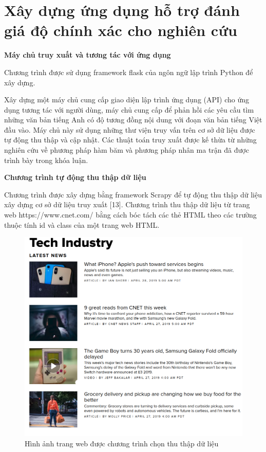 \documentclass[12pt]{report}
\begin{document}
\section{Xây dựng ứng dụng hỗ trợ đánh giá độ chính xác cho nghiên cứu}
\textbf{Máy chủ truy xuất và tương tác với ứng dụng}

Chương trình được sử dụng framework flask của ngôn ngữ lập trình Python để xây dựng.

Xây dựng một máy chủ cung cấp giao diện lập trình ứng dụng (API) cho ứng dụng tương tác với người dùng, máy chủ cung cấp để phản hồi các yêu cầu tìm những văn bản tiếng Anh có độ tương đồng nội dung với đoạn văn bản tiếng Việt đầu vào. Máy chủ này sử dụng những thư viện truy vấn trên cơ sở dữ liệu được tự động thu thập và cập nhật. Các thuật toán truy xuất được kế thừa từ những nghiên cứu về phương pháp hàm băm và phương pháp nhân ma trận đã được trình bày trong khóa luận.

\noindent\textbf{Chương trình tự động thu thập dữ liệu}

Chương trình được xây dựng bằng framework Scrapy để tự động thu thập dữ liệu xây dựng cơ sở dữ liệu truy xuất [13]. Chương trình thu thập dữ liệu từ trang web https://www.cnet.com/ bằng cách bóc tách các thẻ HTML theo các trường thuộc tính id và class của một trang web HTML.

\begin{figure}[h]
	\centering
	\includegraphics[scale=0.3]{cnet}
	\caption{Hình ảnh trang web được chương trình chọn thu thập dữ liệu}
\end{figure}
\end{document}
